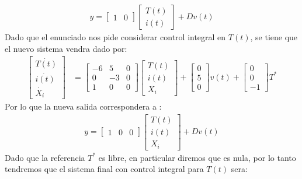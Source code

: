 \documentclass[
  11pt,
  letterpaper,
   addpoints,
   answers
  ]{exam}
\begin{document}
\begin{questions}
\begin{solution}
\begin{align}
    y=
    \begin{bmatrix}
        1 & 0  
    \end{bmatrix}
    \begin{bmatrix}
        T(t)\\
        i(t)
    \end{bmatrix}
    + Dv(t)
\end{align}
Dado que el enunciado nos pide considerar control integral en \( T(t) \), se tiene que el nuevo sistema vendra dado por:
\begin{align}
    \begin{bmatrix}
        \dot{T(t)}\\
        \dot{i(t)}\\
        \dot{X_{i}}
    \end{bmatrix}
    &=
    \begin{bmatrix}
        -6 & 5 & 0\\
        0 & -3 & 0\\
        1 & 0 & 0
    \end{bmatrix}
    \begin{bmatrix}
        T(t)\\
        i(t)\\
        X_{i}
    \end{bmatrix}
    +
    \begin{bmatrix}
        0\\
        5\\
        0
    \end{bmatrix}
    v(t)
    +
    \begin{bmatrix}
        0\\
        0\\
        -1
    \end{bmatrix}
    T^{*} 
\end{align}
Por lo que la nueva salida correspondera a :
\begin{align}
    y=
    \begin{bmatrix}
        1 & 0 & 0
    \end{bmatrix}
    \begin{bmatrix}
        T(t)\\
        i(t)\\
        X_{i}
    \end{bmatrix}
    + Dv(t)
\end{align}
Dado que la referencia $T^{*}$ es libre, en particular diremos que es nula, por lo tanto tendremos que el sistema final con control integral para $T(t)$ sera:

\end{solution}
\end{questions}
\end{document}
